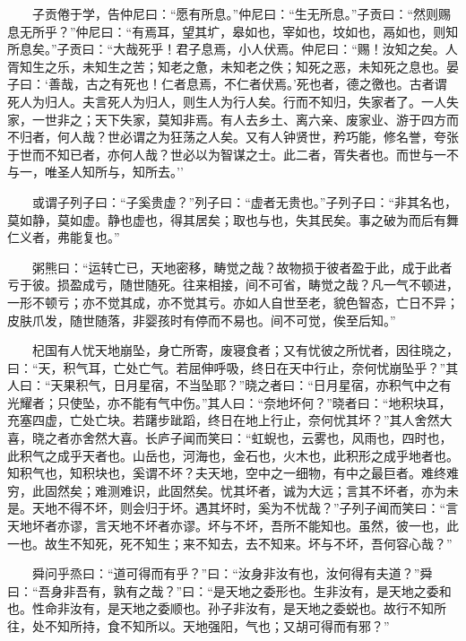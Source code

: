 　　子贡倦于学，告仲尼曰：``愿有所息。''仲尼曰：``生无所息。''子贡曰：``然则赐息无所乎？''仲尼曰：``有焉耳，望其圹，皋如也，宰如也，坟如也，鬲如也，则知所息矣。''子贡曰：``大哉死乎！君子息焉，小人伏焉。仲尼曰：``赐！汝知之矣。人胥知生之乐，未知生之苦；知老之惫，未知老之佚；知死之恶，未知死之息也。晏子曰：`善哉，古之有死也！仁者息焉，不仁者伏焉。'死也者，德之徼也。古者谓死人为归人。夫言死人为归人，则生人为行人矣。行而不知归，失家者了。一人失家，一世非之；天下失家，莫知非焉。有人去乡土、离六亲、废家业、游于四方而不归者，何人哉？世必谓之为狂荡之人矣。又有人钟贤世，矜巧能，修名誉，夸张于世而不知已者，亦何人哉？世必以为智谋之士。此二者，胥失者也。而世与一不与一，唯圣人知所与，知所去。''

　　或谓子列子曰：``子奚贵虚？''列子曰：``虚者无贵也。''子列子曰：``非其名也，莫如静，莫如虚。静也虚也，得其居矣；取也与也，失其民矣。事之破为而后有舞仁义者，弗能复也。''

　　粥熊曰：``运转亡已，天地密移，畴觉之哉？故物损于彼者盈于此，成于此者亏于彼。损盈成亏，随世随死。往来相接，间不可省，畴觉之哉？凡一气不顿进，一形不顿亏；亦不觉其成，亦不觉其亏。亦如人自世至老，貌色智态，亡日不异；皮肤爪发，随世随落，非婴孩时有停而不易也。间不可觉，俟至后知。''

　　杞国有人忧天地崩坠，身亡所寄，废寝食者；又有忧彼之所忧者，因往晓之，曰：``天，积气耳，亡处亡气。若屈伸呼吸，终日在天中行止，奈何忧崩坠乎？''其人曰：``天果积气，日月星宿，不当坠耶？''晓之者曰：``日月星宿，亦积气中之有光耀者；只使坠，亦不能有气中伤。''其人曰：``奈地坏何？''晓者曰：``地积块耳，充塞四虚，亡处亡块。若躇步跐蹈，终日在地上行止，奈何忧其坏？''其人舍然大喜，晓之者亦舍然大喜。长庐子闻而笑曰：``虹蜺也，云雾也，风雨也，四时也，此积气之成乎天者也。山岳也，河海也，金石也，火木也，此积形之成乎地者也。知积气也，知积块也，奚谓不坏？夫天地，空中之一细物，有中之最巨者。难终难穷，此固然矣；难测难识，此固然矣。忧其坏者，诚为大远；言其不坏者，亦为未是。天地不得不坏，则会归于坏。遇其坏时，奚为不忧哉？''子列子闻而笑曰：``言天地坏者亦谬，言天地不坏者亦谬。坏与不坏，吾所不能知也。虽然，彼一也，此一也。故生不知死，死不知生；来不知去，去不知来。坏与不坏，吾何容心哉？''

　　舜问乎烝曰：``道可得而有乎？''曰：``汝身非汝有也，汝何得有夫道？''舜曰：``吾身非吾有，孰有之哉？''曰：``是天地之委形也。生非汝有，是天地之委和也。性命非汝有，是天地之委顺也。孙子非汝有，是天地之委蜕也。故行不知所往，处不知所持，食不知所以。天地强阳，气也；又胡可得而有邪？''


